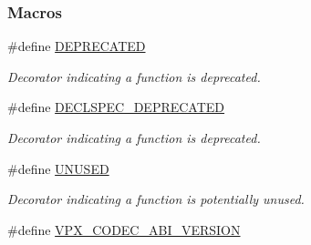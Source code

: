 \subsubsection*{Macros}
\begin{DoxyCompactItemize}
\item 
\hypertarget{group__codec_gac1e8a42306d8e67cb94ca31c3956ee78}{\#define \hyperlink{group__codec_gac1e8a42306d8e67cb94ca31c3956ee78}{D\+E\+P\+R\+E\+C\+A\+T\+E\+D}}\label{group__codec_gac1e8a42306d8e67cb94ca31c3956ee78}

\begin{DoxyCompactList}\small\item\em Decorator indicating a function is deprecated. \end{DoxyCompactList}\item 
\#define \hyperlink{group__codec_gab61b56b074706ee8423d864b511212ad}{D\+E\+C\+L\+S\+P\+E\+C\+\_\+\+D\+E\+P\+R\+E\+C\+A\+T\+E\+D}
\begin{DoxyCompactList}\small\item\em Decorator indicating a function is deprecated. \end{DoxyCompactList}\item 
\hypertarget{group__codec_gaddf5ec070e9499d36b7f2009ce736076}{\#define \hyperlink{group__codec_gaddf5ec070e9499d36b7f2009ce736076}{U\+N\+U\+S\+E\+D}}\label{group__codec_gaddf5ec070e9499d36b7f2009ce736076}

\begin{DoxyCompactList}\small\item\em Decorator indicating a function is potentially unused. \end{DoxyCompactList}\item 
\hypertarget{group__codec_gaf7e9cad2df0f81679b881f46740ad097}{\#define \hyperlink{group__codec_gaf7e9cad2df0f81679b881f46740ad097}{V\+P\+X\+\_\+\+C\+O\+D\+E\+C\+\_\+\+A\+B\+I\+\_\+\+V\+E\+R\+S\+I\+O\+N}}\label{group__codec_gaf7e9cad2df0f81679b881f46740ad097}


\end{DoxyCompactItemize}
